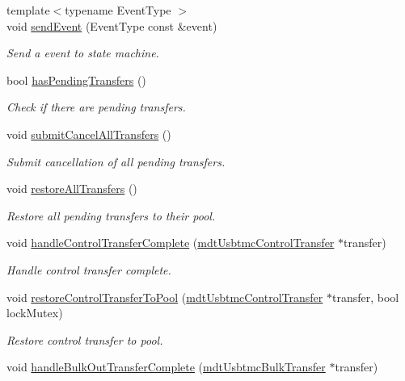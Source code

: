 \begin{DoxyCompactItemize}
{\footnotesize template$<$typename Event\-Type $>$ }\\void \hyperlink{classmdt_usbtmc_transfer_handler_afbc68b65a0c04b19948d0db5761d1f31}{send\-Event} (Event\-Type const \&event)
\begin{DoxyCompactList}\small\item\em Send a event to state machine. \end{DoxyCompactList}\item 
bool \hyperlink{classmdt_usbtmc_transfer_handler_a5e5b27c48d1b2f9937ac97a526febfdb}{has\-Pending\-Transfers} ()
\begin{DoxyCompactList}\small\item\em Check if there are pending transfers. \end{DoxyCompactList}\item 
void \hyperlink{classmdt_usbtmc_transfer_handler_a5622344f0456223485a474885df5a786}{submit\-Cancel\-All\-Transfers} ()
\begin{DoxyCompactList}\small\item\em Submit cancellation of all pending transfers. \end{DoxyCompactList}\item 
void \hyperlink{classmdt_usbtmc_transfer_handler_ab6249e4bfc67689b8eb35decace8cab9}{restore\-All\-Transfers} ()
\begin{DoxyCompactList}\small\item\em Restore all pending transfers to their pool. \end{DoxyCompactList}\item 
void \hyperlink{classmdt_usbtmc_transfer_handler_ac553e8fd400d969f866912f165436582}{handle\-Control\-Transfer\-Complete} (\hyperlink{classmdt_usbtmc_control_transfer}{mdt\-Usbtmc\-Control\-Transfer} $\ast$transfer)
\begin{DoxyCompactList}\small\item\em Handle control transfer complete. \end{DoxyCompactList}\item 
void \hyperlink{classmdt_usbtmc_transfer_handler_a2961d7f5121d2471602d39c7e3002e40}{restore\-Control\-Transfer\-To\-Pool} (\hyperlink{classmdt_usbtmc_control_transfer}{mdt\-Usbtmc\-Control\-Transfer} $\ast$transfer, bool lock\-Mutex)
\begin{DoxyCompactList}\small\item\em Restore control transfer to pool. \end{DoxyCompactList}\item 
void \hyperlink{classmdt_usbtmc_transfer_handler_a1634648e3cb884b36fb9bb8cd47bbacb}{handle\-Bulk\-Out\-Transfer\-Complete} (\hyperlink{classmdt_usbtmc_bulk_transfer}{mdt\-Usbtmc\-Bulk\-Transfer} $\ast$transfer)

\end{DoxyCompactItemize}
